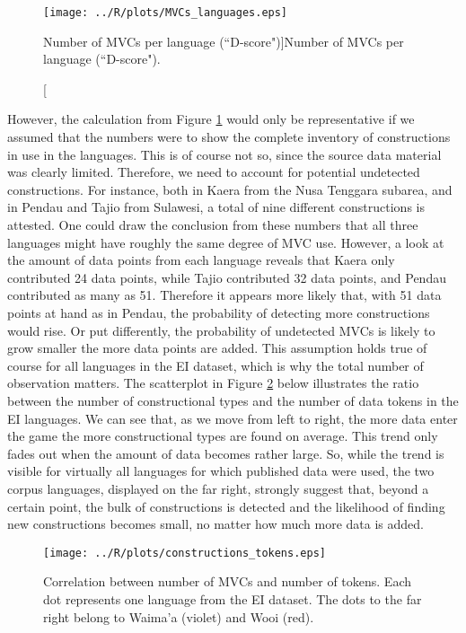\begin{figure}
\texttt{[image: ../R/plots/MVCs\_languages.eps]}
\caption[Number of MVCs per language (``D-score")]{Number of MVCs per language (``D-score").}\label{fig:number_types}
\end{figure}


However, the calculation from Figure \ref{fig:number_types} would only be representative if we assumed that the numbers were to show the complete inventory of constructions in use in the languages. This is of course not so, since the source data material was clearly limited. Therefore, we need to account for potential undetected constructions. For instance, both in Kaera from the Nusa Tenggara subarea, and in Pendau and Tajio from Sulawesi, a total of nine different constructions is attested. One could draw the conclusion from these numbers that all three languages might have roughly the same degree of MVC use. However, a look at the amount of data points from each language reveals that Kaera only contributed 24 data points, while Tajio contributed 32 data points, and Pendau contributed as many as 51. Therefore it appears more likely that, with 51 data points at hand as in Pendau, the probability of detecting more constructions would rise. Or put differently, the probability of undetected MVCs is likely to grow smaller the more data points are added. This assumption holds true of course for all languages in the EI dataset, which is why the total number of observation matters. The scatterplot in Figure \ref{fig:constructions_tokens} below illustrates the ratio between the number of constructional types and the number of data tokens in the EI languages. We can see that, as we move from left to right, the more data enter the game the more constructional types are found on average. This trend only fades out when the amount of data becomes rather large. So, while the trend is visible for virtually all languages for which published data were used, the two corpus languages, displayed on the far right, strongly suggest that, beyond a certain point, the bulk of constructions is detected and the likelihood of finding new constructions becomes small, no matter how much more data is added.

\begin{figure}
\texttt{[image: ../R/plots/constructions\_tokens.eps]}
\caption[Correlation between number of MVCs and number of tokens]{Correlation between number of MVCs and number of tokens. Each dot represents one language from the EI dataset. The dots to the far right belong to Waima'a (violet) and Wooi (red).}\label{fig:constructions_tokens}
\end{figure}


